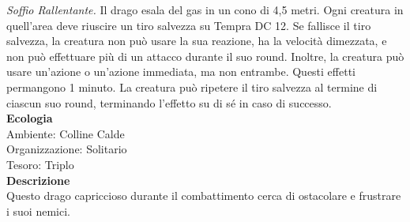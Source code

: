 \begin{multicols}{2}
\emph{Soffio Rallentante.} Il drago esala del gas in un cono di 4,5 metri. Ogni creatura in quell'area deve riuscire un tiro salvezza su Tempra DC  12. Se fallisce il tiro salvezza, la creatura non può usare la sua reazione, ha la velocità dimezzata, e non può effettuare più di un attacco durante il suo round. Inoltre, la creatura può usare un'azione o un'azione immediata, ma non entrambe. Questi effetti permangono 1 minuto. La creatura può ripetere il tiro salvezza al termine di ciascun suo round, terminando l'effetto su di sé in caso di successo.\\
\textbf{Ecologia}\\
Ambiente: Colline Calde\\
Organizzazione: Solitario\\
Tesoro: Triplo\\
\textbf{Descrizione}\\
Questo drago capriccioso durante il combattimento cerca di ostacolare e frustrare i suoi nemici.\\



\end{multicols}
